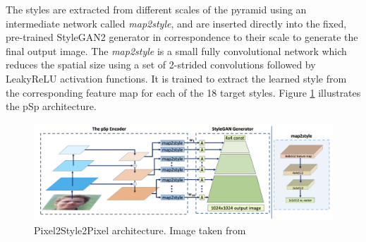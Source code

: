 The styles are extracted from different scales of the pyramid using an intermediate network called \textit{map2style}, and are inserted directly into the fixed, pre-trained StyleGAN2 generator in correspondence to their scale to generate the final output image.
The \textit{map2style} is a small fully convolutional network which reduces the spatial size using a set of 2-strided convolutions followed by LeakyReLU activation functions. It is trained to extract the learned style from the corresponding feature map for each of the 18 target styles. Figure \ref{fig:pSp encoder architecture} illustrates the pSp architecture.
 \begin{figure}[htbp]
\centering
  \includegraphics[scale=0.43]{figures/psp-architecture.png}
  \caption{Pixel2Style2Pixel architecture. Image taken from \cite{pSp}}
  \label{fig:pSp encoder architecture}
\end{figure}

